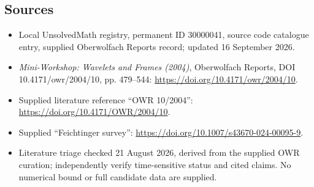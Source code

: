 \documentclass[11pt]{article}
\begin{document}
\subsection{Sources}
\begin{itemize}
\item Local UnsolvedMath registry, permanent ID 30000041, source code catalogue entry, supplied Oberwolfach Reports record; updated 16 September 2026.
\item \emph{Mini-Workshop: Wavelets and Frames (2004)}, Oberwolfach Reports, DOI 10.4171/owr/2004/10, pp. 479--544: \url{https://doi.org/10.4171/owr/2004/10}.
\item Supplied literature reference ``OWR 10/2004'': \url{https://doi.org/10.4171/OWR/2004/10}.
\item Supplied ``Feichtinger survey'': \url{https://doi.org/10.1007/s43670-024-00095-9}.
\item Literature triage checked 21 August 2026, derived from the supplied OWR curation; independently verify time-sensitive status and cited claims. No numerical bound or full candidate data are supplied.
\end{itemize}
\end{document}
